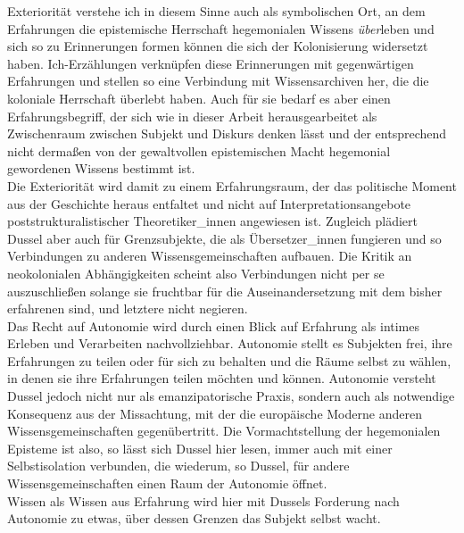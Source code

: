 \noindent Exteriorität verstehe ich in diesem Sinne auch als symbolischen Ort, an dem
Erfahrungen die epistemische Herrschaft hegemonialen Wissens \textit{über}leben und sich
so zu Erinnerungen formen können die sich der Kolonisierung widersetzt haben.
Ich-Erzählungen verknüpfen diese Erinnerungen mit gegenwärtigen Erfahrungen und
stellen so eine Verbindung mit Wissensarchiven her, die die koloniale Herrschaft
überlebt haben. Auch für sie bedarf es aber einen Erfahrungsbegriff, der sich
wie in dieser Arbeit herausgearbeitet als Zwischenraum zwischen Subjekt und
Diskurs denken lässt und der entsprechend nicht dermaßen von der gewaltvollen
epistemischen Macht hegemonial gewordenen Wissens bestimmt ist.\\
Die Exteriorität
wird damit zu einem Erfahrungsraum, der das politische Moment aus der Geschichte
heraus entfaltet und nicht auf Interpretationsangebote poststrukturalistischer
Theoretiker\_innen angewiesen ist. Zugleich plädiert Dussel aber auch für
Grenzsubjekte, die als Übersetzer\_innen fungieren und so Verbindungen zu anderen
Wissensgemeinschaften aufbauen. Die Kritik an neokolonialen Abhängigkeiten
scheint also Verbindungen nicht per se auszuschließen solange sie fruchtbar für
die Auseinandersetzung mit dem bisher erfahrenen sind, und letztere nicht
negieren.\\

\noindent Das Recht auf Autonomie wird durch einen Blick auf Erfahrung als intimes Erleben
und Verarbeiten nachvollziehbar. Autonomie stellt es Subjekten frei, ihre
Erfahrungen zu teilen oder für sich zu behalten und die Räume selbst zu wählen,
in denen sie ihre Erfahrungen teilen möchten und können. Autonomie versteht
Dussel jedoch nicht nur als emanzipatorische Praxis, sondern auch als notwendige
Konsequenz aus der Missachtung, mit der die europäische Moderne anderen
Wissensgemeinschaften gegenübertritt. Die Vormachtstellung der hegemonialen
Episteme ist also, so lässt sich Dussel hier lesen, immer auch mit einer
Selbstisolation verbunden, die wiederum, so Dussel, für andere Wissensgemeinschaften einen Raum der Autonomie öffnet.\\
Wissen als Wissen aus Erfahrung wird hier mit Dussels Forderung nach Autonomie zu etwas, über dessen Grenzen das Subjekt selbst wacht.\\

